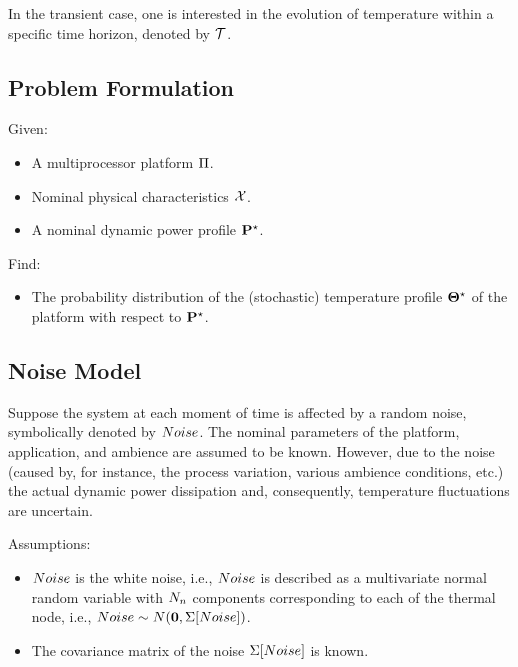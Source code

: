 In the transient case, one is interested in the evolution of temperature within a specific time horizon, denoted by $\mathcal{T}$.

\subsection{Problem Formulation}
Given:
\begin{itemize}
  \item A multiprocessor platform $\Pi$.
  \item Nominal physical characteristics $\mathcal{X}$.
  \item A nominal dynamic power profile $\mathbf{P}^\star$.
\end{itemize}

Find:
\begin{itemize}
  \item The probability distribution of the (stochastic) temperature profile $\mathbf{\Theta}^\star$ of the platform with respect to $\mathbf{P}^\star$.
\end{itemize}

\subsection{Noise Model}
Suppose the system at each moment of time is affected by a random noise, symbolically denoted by $Noise$. The nominal parameters of the platform, application, and ambience are assumed to be known. However, due to the noise (caused by, for instance, the process variation, various ambience conditions, etc.) the actual dynamic power dissipation and, consequently, temperature fluctuations are uncertain.

Assumptions:
\begin{itemize}
  \item $Noise$ is the white noise, i.e., $Noise$ is described as a multivariate normal random variable with $N_n$ components corresponding to each of the thermal node, i.e., $Noise \sim N(\mathbf{0}, \Sigma[Noise])$.
  \item The covariance matrix of the noise $\Sigma[Noise]$ is known.
\end{itemize}

